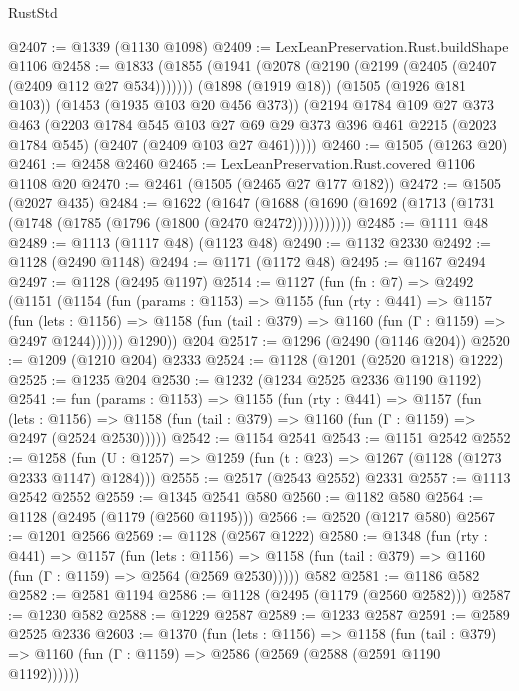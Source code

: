 \begin{lexlean}{RustStd}
\begin{coremodule}
@2407 := @1339 (@1130 @1098)
@2409 := LexLeanPreservation.Rust.buildShape @1106
@2458 := @1833
    (@1855
      (@1941 (@2078 (@2190 (@2199 (@2405 (@2407 (@2409 @112 @27 @534)))))))
      (@1898 (@1919 @18))
      (@1505 (@1926 @181 @103))
      (@1453 (@1935 @103 @20 @456 @373))
      (@2194
        @1784
        @109
        @27
        @373
        @463
        (@2203
          @1784
          @545
          @103
          @27
          @69
          @29
          @373
          @396
          @461
          @2215
          (@2023 @1784 @545)
          (@2407 (@2409 @103 @27 @461)))))
@2460 := @1505 (@1263 @20)
@2461 := @2458 @2460
@2465 := LexLeanPreservation.Rust.covered @1106 @1108 @20
@2470 := @2461 (@1505 (@2465 @27 @177 @182))
@2472 := @1505 (@2027 @435)
@2484 := @1622
    (@1647 (@1688 (@1690 (@1692 (@1713 (@1731 (@1748 (@1785 (@1796 (@1800 (@2470 @2472)))))))))))
@2485 := @1111 @48
@2489 := @1113 (@1117 @48) (@1123 @48)
@2490 := @1132 @2330
@2492 := @1128 (@2490 @1148)
@2494 := @1171 (@1172 @48)
@2495 := @1167 @2494
@2497 := @1128 (@2495 @1197)
@2514 := @1127
    (fun (fn : @7) =>
    @2492
      (@1151
        (@1154
          (fun (params : @1153) =>
          @1155
            (fun (rty : @441) =>
            @1157
              (fun (lets : @1156) =>
              @1158 (fun (tail : @379) => @1160 (fun (Γ : @1159) => @2497 @1244))))))
        @1290))
    @204
@2517 := @1296 (@2490 (@1146 @204))
@2520 := @1209 (@1210 @204) @2333
@2524 := @1128 (@1201 (@2520 @1218) @1222)
@2525 := @1235 @204
@2530 := @1232 (@1234 @2525 @2336 @1190 @1192)
@2541 := fun (params : @1153) =>
  @1155
    (fun (rty : @441) =>
    @1157
      (fun (lets : @1156) =>
      @1158 (fun (tail : @379) => @1160 (fun (Γ : @1159) => @2497 (@2524 @2530)))))
@2542 := @1154 @2541
@2543 := @1151 @2542
@2552 := @1258 (fun (U : @1257) => @1259 (fun (t : @23) => @1267 (@1128 (@1273 @2333 @1147) @1284)))
@2555 := @2517 (@2543 @2552) @2331
@2557 := @1113 @2542 @2552
@2559 := @1345 @2541 @580
@2560 := @1182 @580
@2564 := @1128 (@2495 (@1179 (@2560 @1195)))
@2566 := @2520 (@1217 @580)
@2567 := @1201 @2566
@2569 := @1128 (@2567 @1222)
@2580 := @1348
    (fun (rty : @441) =>
    @1157
      (fun (lets : @1156) =>
      @1158 (fun (tail : @379) => @1160 (fun (Γ : @1159) => @2564 (@2569 @2530)))))
    @582
@2581 := @1186 @582
@2582 := @2581 @1194
@2586 := @1128 (@2495 (@1179 (@2560 @2582)))
@2587 := @1230 @582
@2588 := @1229 @2587
@2589 := @1233 @2587
@2591 := @2589 @2525 @2336
@2603 := @1370
    (fun (lets : @1156) =>
    @1158
      (fun (tail : @379) => @1160 (fun (Γ : @1159) => @2586 (@2569 (@2588 (@2591 @1190 @1192))))))

\end{coremodule}
\end{lexlean}
